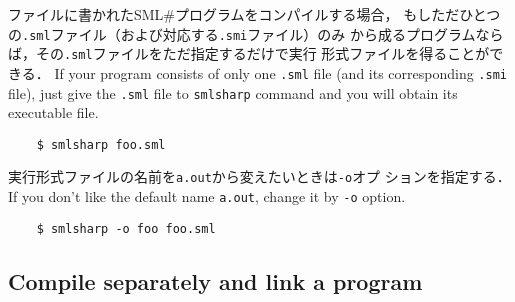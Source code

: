 \documentclass{jbook}
\newcommand{\txt}[2]{#2}
\newcommand{\smlsharp}{SML\#}
\begin{document}
\ifjp%
	ファイルに書かれた\smlsharp{}プログラムをコンパイルする場合，
もしただひとつの{\tt .sml}ファイル（および対応する{\tt .smi}ファイル）のみ
から成るプログラムならば，その{\tt .sml}ファイルをただ指定するだけで実行
形式ファイルを得ることができる．
\else%
	If your program consists of only one {\tt .sml} file (and its
corresponding {\tt .smi} file), just give the {\tt .sml} file to
{\tt smlsharp} command and you will obtain its executable file.
\fi%
\begin{verbatim}
    $ smlsharp foo.sml
\end{verbatim}
\ifjp%
	実行形式ファイルの名前を{\tt a.out}から変えたいときは{\tt -o}オプ
ションを指定する．
\else%
	If you don't like the default name {\tt a.out}, change it by
{\tt -o} option.
\fi%
\begin{verbatim}
    $ smlsharp -o foo foo.sml
\end{verbatim}

\subsection{\txt{分割コンパイルとリンク}{Compile separately and link a program}}
\end{document}
